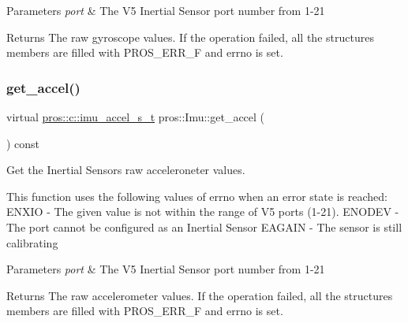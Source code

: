 \begin{DoxyParams}{Parameters}
{\em port} & The V5 Inertial Sensor port number from 1-\/21 \\
\hline
\end{DoxyParams}
\begin{DoxyReturn}{Returns}
The raw gyroscope values. If the operation failed, all the structure\textquotesingle{}s members are filled with P\+R\+O\+S\+\_\+\+E\+R\+R\+\_\+F and errno is set. 
\end{DoxyReturn}
\mbox{\label{classpros_1_1Imu_ac9a047f46e7ae8d73a6189091df20150}} 
\subsubsection{\texorpdfstring{get\+\_\+accel()}{get\_accel()}}
{\footnotesize\ttfamily virtual \hyperlink{imu_8h_a70eb3173193f4f46266eade4c243f662}{pros\+::c\+::imu\+\_\+accel\+\_\+s\+\_\+t} pros\+::\+Imu\+::get\+\_\+accel (\begin{DoxyParamCaption}{ }\end{DoxyParamCaption}) const\hspace{0.3cm}{\ttfamily [virtual]}}



Get the Inertial Sensor\textquotesingle{}s raw acceleroneter values. 

This function uses the following values of errno when an error state is reached\+: E\+N\+X\+IO -\/ The given value is not within the range of V5 ports (1-\/21). E\+N\+O\+D\+EV -\/ The port cannot be configured as an Inertial Sensor E\+A\+G\+A\+IN -\/ The sensor is still calibrating


\begin{DoxyParams}{Parameters}
{\em port} & The V5 Inertial Sensor port number from 1-\/21 \\
\hline
\end{DoxyParams}
\begin{DoxyReturn}{Returns}
The raw accelerometer values. If the operation failed, all the structure\textquotesingle{}s members are filled with P\+R\+O\+S\+\_\+\+E\+R\+R\+\_\+F and errno is set. 
\end{DoxyReturn}
\mbox{\label{classpros_1_1Imu_ad38c8f55b89f8d2e7b68a6bda0029559}} 
